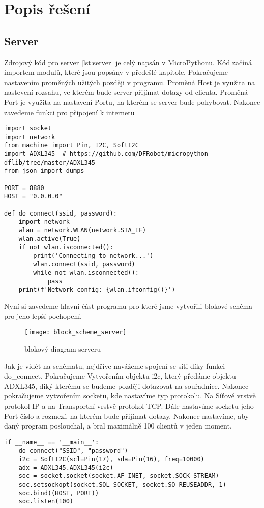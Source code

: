 \documentclass[12pt]{report}			%
\begin{document}
\section{Popis řešení}
\subsection{Server}
Zdrojový kód pro server \ref{lst:server} je celý napsán v MicroPythonu. Kód začíná importem modulů, které jsou popsány v předešlé kapitole. Pokračujeme nastavením proměných užitých později v programu. Proměná Host je využita na nastevení rozsahu, ve kterém bude server přijímat dotazy od clienta. Proměná Port je využita na nastavení Portu, na kterém se server bude pohybovat. Nakonec zavedeme funkci pro připojení k internetu
\begin{lstlisting}[title={Program server.py}, caption={server.py}]
import socket
import network
from machine import Pin, I2C, SoftI2C
import ADXL345  # https://github.com/DFRobot/micropython-dflib/tree/master/ADXL345
from json import dumps

PORT = 8880
HOST = "0.0.0.0"

def do_connect(ssid, password):
    import network
    wlan = network.WLAN(network.STA_IF)
    wlan.active(True)
    if not wlan.isconnected():
        print('Connecting to network...')
        wlan.connect(ssid, password)
        while not wlan.isconnected():
            pass
    print(f'Network config: {wlan.ifconfig()}')

\end{lstlisting}
Nyní si zavedeme hlavní část programu pro které jsme vytvořili blokové schéma pro jeho lepší pochopení. 

\begin{figure}[h]
\caption{blokový diagram serveru}
\centering
 \texttt{[image: block\_scheme\_server]}
\end{figure}

Jak je vidět na schématu, nejdříve navážeme spojení se síti díky funkci do\_connect. Pokračujeme Vytvořením objektu i2c, který předáme objektu ADXL345, diký kterému se budeme později dotazovat na souřadnice. Nakonec pokračujeme vytvořením socketu, kde nastavíme typ protokolu. Na Síťové vrstvě protokol IP a na Transportní vrstvě protokol TCP. Dále nastavíme socketu jeho Port číslo a rozmezí, na kterém bude přijímat dotazy. Nakonec nastavíme, aby daný program poslouchal, a bral maximálně 100 clientů v jeden moment. 
\begin{lstlisting}[title={Program server.py}, caption={server.py}]
if __name__ == '__main__':
    do_connect("SSID", "password")
    i2c = SoftI2C(scl=Pin(17), sda=Pin(16), freq=10000)
    adx = ADXL345.ADXL345(i2c)
    soc = socket.socket(socket.AF_INET, socket.SOCK_STREAM)
    soc.setsockopt(socket.SOL_SOCKET, socket.SO_REUSEADDR, 1)
    soc.bind((HOST, PORT))
    soc.listen(100)
\end{lstlisting}
\end{document}

